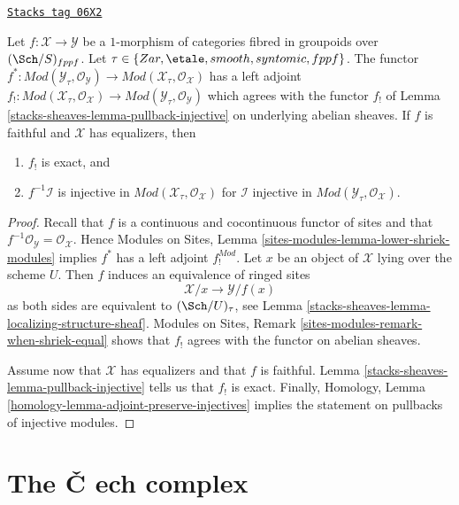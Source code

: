 \begin{lemma}
\label{stacks-sheaves-lemma-pullback-injective-modules}
\href{https://stacks.math.columbia.edu/tag/06X2}{\texttt{Stacks tag 06X2}}

Let $f : \mathcal{X} \to \mathcal{Y}$ be a $1$-morphism of categories
fibred in groupoids over $(\Sch/S)_{fppf}$. Let
$\tau \in \{Zar, \etale, smooth, syntomic, fppf\}$.
The functor
$f^* : \textit{Mod}(\mathcal{Y}_\tau, \mathcal{O}_\mathcal{Y}) \to
\textit{Mod}(\mathcal{X}_\tau, \mathcal{O}_\mathcal{X})$
has a left adjoint
$f_! : \textit{Mod}(\mathcal{X}_\tau, \mathcal{O}_\mathcal{X}) \to
\textit{Mod}(\mathcal{Y}_\tau, \mathcal{O}_\mathcal{Y})$ which
agrees with the functor $f_!$ of Lemma \ref{stacks-sheaves-lemma-pullback-injective}
on underlying abelian sheaves.
If $f$ is faithful and $\mathcal{X}$ has equalizers, then
\begin{enumerate}
\item $f_!$ is exact, and
\item $f^{-1}\mathcal{I}$ is injective in
$\textit{Mod}(\mathcal{X}_\tau, \mathcal{O}_\mathcal{X})$
for $\mathcal{I}$ injective in
$\textit{Mod}(\mathcal{Y}_\tau, \mathcal{O}_\mathcal{X})$.
\end{enumerate}
\end{lemma}

\begin{proof}
Recall that $f$ is a continuous and cocontinuous functor of sites
and that $f^{-1}\mathcal{O}_\mathcal{Y} = \mathcal{O}_\mathcal{X}$. Hence
Modules on Sites, Lemma \ref{sites-modules-lemma-lower-shriek-modules}
implies $f^*$ has a left adjoint $f_!^{Mod}$.
Let $x$ be an object of $\mathcal{X}$ lying over the scheme $U$.
Then $f$ induces an equivalence of ringed sites
$$
\mathcal{X}/x \longrightarrow \mathcal{Y}/f(x)
$$
as both sides are equivalent to $(\Sch/U)_\tau$, see
Lemma \ref{stacks-sheaves-lemma-localizing-structure-sheaf}.
Modules on Sites, Remark \ref{sites-modules-remark-when-shriek-equal}
shows that $f_!$ agrees with the functor on abelian sheaves.

\medskip\noindent
Assume now that $\mathcal{X}$ has equalizers and that $f$ is faithful.
Lemma \ref{stacks-sheaves-lemma-pullback-injective}
tells us that $f_!$ is exact. Finally,
Homology, Lemma \ref{homology-lemma-adjoint-preserve-injectives}
implies the statement on pullbacks of injective modules.
\end{proof}

\section{The {\v C}
ech complex}
\label{stacks-sheaves-section-cech}

